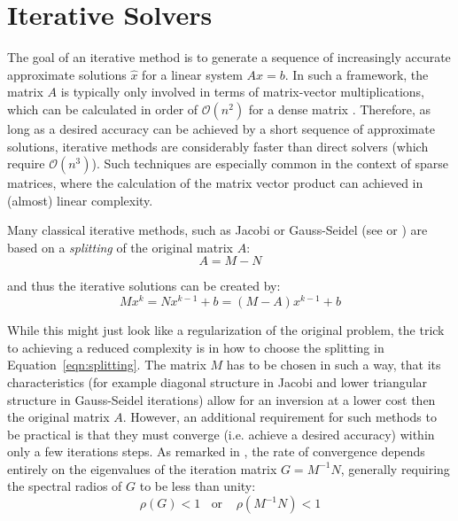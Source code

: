 \section{Iterative Solvers}
\label{sec:iterative_solvers}

The goal of an iterative method is to generate a sequence of increasingly accurate approximate solutions $\hat{x}$ for a linear system $Ax=b$. In such a framework, the matrix $A$ is typically only involved in terms of matrix-vector multiplications, which can be calculated in order of $\mathcal{O}(n^2)$ for a dense matrix \cite{golub_matrix_2013}. Therefore, as long as a desired accuracy can be achieved by a short sequence of approximate solutions, iterative methods are considerably faster than direct solvers (which require $\mathcal{O}(n^3)$). Such techniques are especially common in the context of sparse matrices, where the calculation of the matrix vector product can achieved in (almost) linear complexity.

Many classical iterative methods, such as Jacobi or Gauss-Seidel (see \cite{golub_matrix_2013} or \cite{saad_iterative_2003}) are based on a \textit{splitting} of the original matrix $A$:
\begin{equation}
\label{eqn:splitting}
    A = M - N
\end{equation}

\noindent and thus the iterative solutions can be created by:
\begin{equation}
    Mx^k = Nx^{k-1} +b = (M-A)x^{k-1}+b
\end{equation}

\noindent While this might just look like a regularization of the original problem, the trick to achieving a reduced complexity is in how to choose the splitting in Equation~\hyperref[eqn:splitting]{\ref{eqn:splitting}}. The matrix $M$ has to be chosen in such a way, that its characteristics (for example diagonal structure in Jacobi and lower triangular structure in Gauss-Seidel iterations) allow for an inversion at a lower cost then the original matrix $A$. However, an additional requirement for such methods to be practical is that they must converge (i.e. achieve a desired accuracy) within only a few iterations steps. As remarked in \cite{golub_matrix_2013}, the rate of convergence depends entirely on the eigenvalues of the iteration matrix $G=M^{-1}N$, generally requiring the spectral radios of $G$ to be less than unity:
\begin{equation}
    \rho(G) < 1 \;\;\text{ or }\;\;\ \rho(M^{-1}N)<1
\end{equation}

